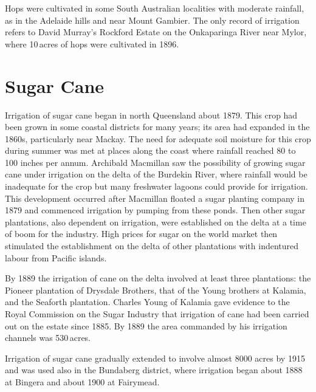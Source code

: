 Hops were cultivated in some South Australian localities with moderate
rainfall, as in the Adelaide hills and near Mount
Gambier.  The only record of irrigation
refers to David Murray's   Rockford Estate on the
Onkaparinga River  near Mylor,  where 10\,acres of hops were cultivated in
1896.

\section*{Sugar Cane} 

Irrigation of sugar cane began in north Queensland about 1879.  This
crop had been grown in some coastal districts for many years; its area
had expanded in the 1860s, particularly near Mackay.  The need for adequate soil moisture for this crop during summer
was met at places along the coast where rainfall reached 80 to 100
inches per annum.  Archibald Macmillan  saw the
possibility of growing sugar cane under irrigation on the delta of the
Burdekin River,  where rainfall would be
inadequate for the crop but many freshwater lagoons could provide for
irrigation.  This development occurred after Macmillan floated a sugar
planting company in 1879 and commenced irrigation by pumping from
these ponds.  Then other sugar plantations, also dependent on
irrigation, were established on the delta at a time of boom for the
industry.  High prices for sugar on the world market then stimulated
the establishment on the delta of other plantations with indentured
labour from Pacific islands.

By 1889 the irrigation of cane on the delta involved at least three
plantations: the Pioneer plantation of Drysdale Brothers,
 that of the Young brothers at Kalamia,
 and the Seaforth plantation.  Charles Young
 of Kalamia gave evidence to the Royal Commission on the Sugar
Industry that irrigation of cane had been carried out on the estate
since 1885. By 1889 the area commanded by his irrigation
channels was 530\,acres.

Irrigation of sugar cane gradually extended to involve almost 8000
acres by 1915 and was used also in the Bundaberg  district, where irrigation began about 1888
at Bingera  and about 1900 at
Fairymead.

